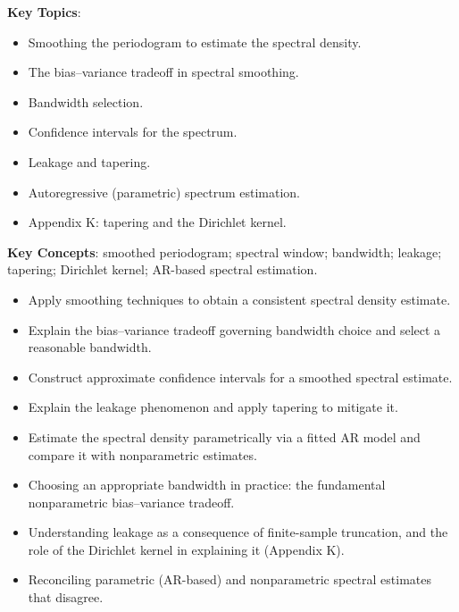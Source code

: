 \documentclass[11pt]{article}
\newcommand{\keytopics}{\textbf{\color{modblue}Key Topics}}
\newcommand{\keyconcepts}{\textbf{\color{modblue}Key Concepts}}
\begin{document}
\keytopics:
\begin{itemize}
  \item Smoothing the periodogram to estimate the spectral density.
  \item The bias--variance tradeoff in spectral smoothing.
  \item Bandwidth selection.
  \item Confidence intervals for the spectrum.
  \item Leakage and tapering.
  \item Autoregressive (parametric) spectrum estimation.
  \item Appendix K: tapering and the Dirichlet kernel.
\end{itemize}

\keyconcepts: smoothed periodogram; spectral window; bandwidth; leakage; tapering; Dirichlet kernel; AR-based spectral estimation.

\begin{objectives}
\begin{itemize}
  \item Apply smoothing techniques to obtain a consistent spectral density estimate.
  \item Explain the bias--variance tradeoff governing bandwidth choice and select a reasonable bandwidth.
  \item Construct approximate confidence intervals for a smoothed spectral estimate.
  \item Explain the leakage phenomenon and apply tapering to mitigate it.
  \item Estimate the spectral density parametrically via a fitted AR model and compare it with nonparametric estimates.
\end{itemize}
\end{objectives}

\begin{difficult}
\begin{itemize}
  \item Choosing an appropriate bandwidth in practice: the fundamental nonparametric bias--variance tradeoff.
  \item Understanding leakage as a consequence of finite-sample truncation, and the role of the Dirichlet kernel in explaining it (Appendix K).
  \item Reconciling parametric (AR-based) and nonparametric spectral estimates that disagree.
\end{itemize}
\end{difficult}
\end{document}

